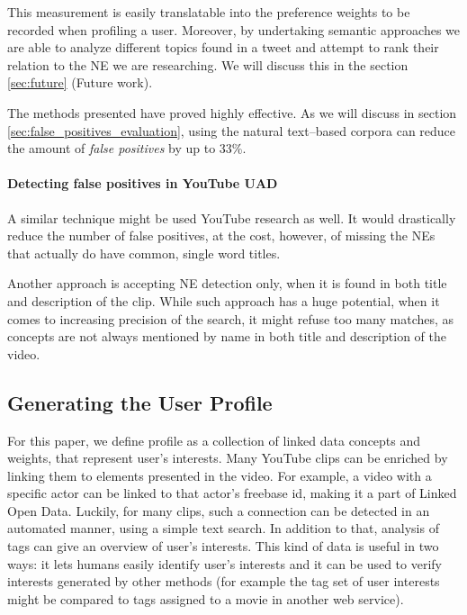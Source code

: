 This measurement is easily translatable into the preference weights to be recorded when profiling a user.
Moreover, by undertaking semantic approaches we are able to analyze different topics found in a tweet and
attempt to rank their relation to the NE we are researching. We will discuss this in the section \ref{sec:future}
(Future work).

The methods presented have proved highly effective. As we will discuss in section \ref{sec:false_positives_evaluation},
using the natural text--based corpora can reduce the amount of \textit{false positives} by up to 33\%.

\paragraph{Detecting false positives in YouTube UAD}

A similar technique might be used YouTube research as well. It would drastically
reduce the number of false positives, at the cost, however, of missing the NEs
that actually do have common, single word titles.

Another approach is accepting NE detection only, when it is found in both title
and description of the clip. While such approach has a huge potential, when it
comes to increasing precision of the search, it might refuse too many matches,
as concepts are not always mentioned by name in both title and description of
the video.

\subsection{Generating the User Profile}

For this paper, we define profile as a collection of linked data concepts and weights,
that represent user's interests. Many YouTube clips can be
enriched by linking them to elements presented in the video. For example, a
video with a specific actor can be linked to that actor's freebase id, making it
a part of Linked Open Data. Luckily, for many clips, such a connection can be
detected in an automated manner, using a simple text search.
In addition to that, analysis of tags can give an overview of user's interests. This kind of data is
useful in two ways: it lets humans easily identify user's interests and it can be
used to verify interests generated by other methods (for example the tag set
of user interests might be compared to tags assigned to a movie in another web
service).

